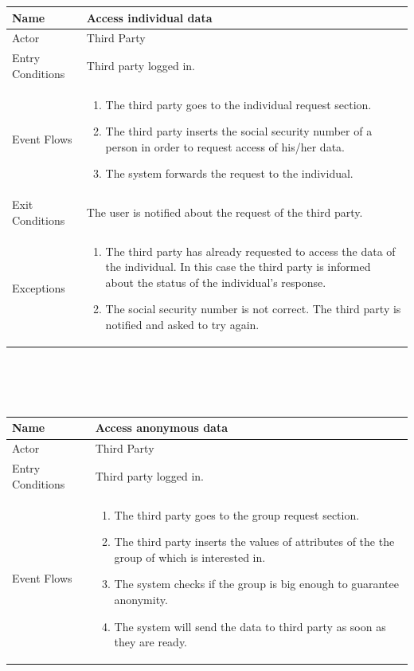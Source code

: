 \documentclass{article}
\begin{document}
\begin{legal}
\begin{legal}
\begin{legal}
\begin{tabular}{| m{3.5cm} | m{8cm}| }
				\hline
					Name & Access individual data\\
				\hline
					Actor & Third Party\\
				\hline
					Entry Conditions & Third party logged in.\\
				\hline
					Event Flows & \begin{enumerate}
									\item The third party goes to the individual request section.
									\item The third party inserts the social security number of a person in order to request access of his/her data.
									\item The system forwards the request to the individual.
				\end{enumerate}\\
				\hline
					Exit Conditions & The user is notified about the request of the third party.\\
				\hline
					Exceptions & \begin{enumerate}
					\item The third party has already requested to access the data of the individual. In this case the third party is informed about the status of the individual's response.
					\item The social security number is not correct. The third party is notified and asked to try again.
					\end{enumerate}\\
				\hline
				\end{tabular}
				\\\\\\
				\begin{tabular}{| m{3.5cm} | m{8cm}| }
				\hline
					Name & Access anonymous data\\
				\hline
					Actor & Third Party\\
				\hline
					Entry Conditions & Third party logged in.\\
				\hline
					Event Flows & \begin{enumerate}
									\item The third party goes to the group request section.
									\item The third party inserts the values of attributes of the the group of which is interested in.
									\item The system checks if the group is big enough to guarantee anonymity.
									\item The system will send the data to third party as soon as they are ready.

\end{enumerate}
\end{tabular}
\end{legal}
\end{legal}
\end{legal}
\end{document}
